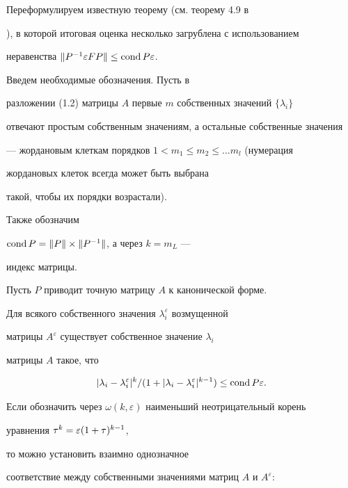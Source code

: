 Переформулируем известную теорему (см. теорему 4.9 в


\cite{LI}), в которой итоговая оценка несколько загрублена с использованием


неравенства $\|P^{-1} \varepsilon F P\|\le \operatorname{cond} P \varepsilon$.


Введем необходимые обозначения. Пусть в


разложении (1.2) матрицы $A$ первые $m$ собственных значений $\{\lambda_i\}$


отвечают простым собственным значениям, а остальные собственные значения


--- жордановым клеткам порядков $1<m_1\le m_2\le \dotsc m_l$ (нумерация


жордановых клеток всегда может быть выбрана 


такой, чтобы их порядки возрастали).


Также обозначим


$\operatorname{cond} P=\|P\|\times\|P^{-1}\|$, а через $k=m_L$ ---


индекс матрицы.





\begin{thm}


Пусть $P$ приводит точную матрицу $A$ к канонической форме.


Для всякого собственного значения $\lambda_i^{\varepsilon}$ возмущенной 


матрицы $A^{\varepsilon}$ существует собственное значение $\lambda_i$


матрицы $A$ такое, что


$$


|\lambda_i-\lambda_i^{\varepsilon}|^k/(1+|\lambda_i-


\lambda_i^{\varepsilon}|^{k-1})\le\cond P \varepsilon.


$$


\end{thm}





Если обозначить через $\omega(k,\varepsilon)$ наименьший неотрицательный корень


уравнения $\tau^k=\linebreak \varepsilon (1+\tau)^{k-1}$, 


то можно установить взаимно однозначное


соответствие между собственными значениями матриц $A$ и $A^{\varepsilon}$:



